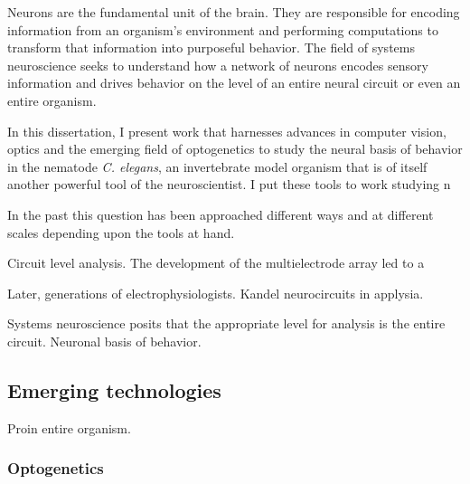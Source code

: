 Neurons are the fundamental unit of the brain.  They are responsible for encoding information from an organism's environment and performing computations to transform that information into purposeful behavior.  The field of systems neuroscience seeks to understand how a network of neurons encodes sensory information and drives behavior on the level of an entire neural circuit or even an entire organism.


In this dissertation, I present work that harnesses advances in computer vision, optics and the emerging field of optogenetics to study the neural basis of behavior in the nematode \emph{C. elegans}, an invertebrate model organism that is of itself another powerful tool of the neuroscientist. I put these tools to work studying n	 

 In the past this question has been approached different ways and at different scales depending upon the tools at hand. 


Circuit level analysis.
The development of the multielectrode array \citep{meister_synchronous_1991} \citep{litke_retinal_1991}  led to a 

Later,  generations of electrophysiologists. 
Kandel neurocircuits in applysia.



Systems neuroscience posits that the appropriate level for analysis is the entire circuit. 
Neuronal basis of behavior. 



\subsection{Emerging technologies}
Proin entire organism. 

\subsubsection{Optogenetics}




